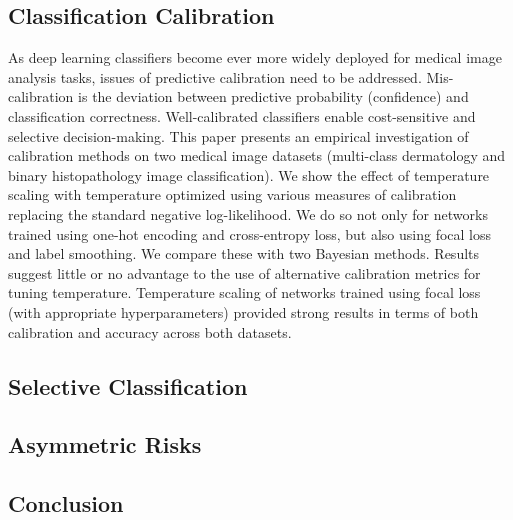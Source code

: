 \subsection*{Classification Calibration}
As deep learning classifiers become ever more widely deployed for medical image analysis tasks, issues of predictive calibration need to be addressed. Mis-calibration is the deviation between predictive probability (confidence) and classification correctness. Well-calibrated classifiers enable cost-sensitive and selective decision-making. This paper presents an empirical investigation of calibration methods on two medical image datasets (multi-class dermatology and binary histopathology image classification). We show the effect of temperature scaling with temperature optimized using various measures of calibration replacing the standard negative log-likelihood. We do so not only for networks trained using one-hot encoding and cross-entropy loss, but also using focal loss and label smoothing. We compare these with two Bayesian methods. Results suggest little or no advantage to the use of alternative calibration metrics for tuning temperature. Temperature scaling of networks trained using focal loss (with appropriate hyperparameters) provided strong results in terms of both calibration and accuracy across both datasets.

\subsection*{Selective Classification}

\subsection*{Asymmetric Risks}

\subsection*{Conclusion}
